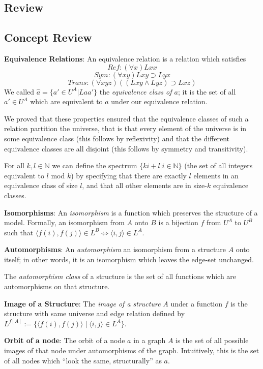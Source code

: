\subsection{Review}
\begin{mdframed}[linewidth=1]
\section*{Concept Review}
\textbf{Equivalence Relations}: An equivalence relation is a relation which satisfies
\[
    Ref: (\forall x)Lxx
\]
\[
    Sym: (\forall xy)Lxy \supset Lyx
\]
\[
    Trans: (\forall xyz)((Lxy \land Lyz) \supset Lxz)
\]
We called $\hat{a} = \{a' \in U^A | Laa'\}$ the \emph{equivalence class of $a$}; it is the set of all $a' \in U^A$ which are equivalent to $a$ under our equivalence relation. 

We proved that these properties ensured that the equivalence classes of such a relation partition the universe, that is that every element of the universe is in some equivalence class (this follows by reflexivity) and that the different equivalence classes are all disjoint (this follows by symmetry and transitivity). 

For all $k, l \in \mathbb{N}$ we can define the spectrum $\{ki + l | i \in \mathbb{N}\}$ (the set of all integers equivalent to $l$ mod $k$) by specifying that there are exactly $l$ elements in an equivalence class of size $l$, and that all other elements are in size-$k$ equivalence classes. 

\textbf{Isomorphisms}: An \emph{isomorphism} is a function which preserves the structure of a model. Formally, an isomorphism from $A$ onto $B$ is a bijection $f$ from $U^A$ to $U^B$ such that $\langle f(i), f(j) \rangle \in L^B \iff \langle i, j \rangle \in L^A$. 

\textbf{Automorphisms}: An \emph{automorphism} an isomorphism from a structure $A$ onto itself; in other words, it is an isomorphism which leaves the edge-set unchanged. 

The \emph{automorphism class} of a structure is the set of all functions which are automorphisms on that structure. 

\textbf{Image of a Structure}: The \emph{image of a structure} $A$ under a function $f$ is the structure with same universe and edge relation defined by $L^{f[A]} := \{\langle f(i), f(j) \rangle \mid \langle i, j \rangle \in L^A\}$. 

\textbf{Orbit of a node}: The orbit of a node $a$ in a graph $A$ is the set of all possible images of that node under automorphisms of the graph. Intuitively, this is the set of all nodes which ``look the same, structurally'' as $a$. 


\end{mdframed}
